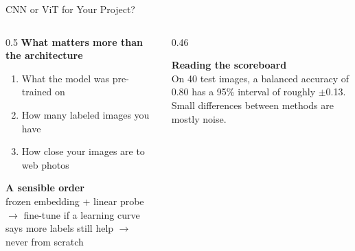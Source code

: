 \begin{frame}{CNN or ViT for Your Project?}
\begin{columns}[T]
\begin{column}{0.5\textwidth}
\textbf{What matters more than the architecture}
\begin{enumerate}
\item What the model was pre-trained on
\item How many labeled images you have
\item How close your images are to web photos
\end{enumerate}

\vspace{0.2cm}
\textbf{A sensible order}\\
frozen embedding + linear probe $\rightarrow$ fine-tune if a learning curve says more labels still
help $\rightarrow$ never from scratch
\end{column}
\begin{column}{0.46\textwidth}
\begin{warnbox}
\textbf{Reading the scoreboard}\\
On 40 test images, a balanced accuracy of 0.80 has a 95\% interval of roughly $\pm$0.13. Small
differences between methods are mostly noise.
\end{warnbox}
\end{column}
\end{columns}
\end{frame}




